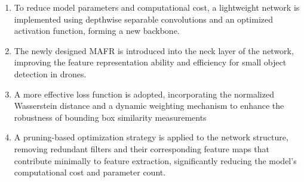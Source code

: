\documentclass{article}
\begin{document}
\begin{enumerate}
  \item To reduce model parameters and computational cost, a lightweight network is implemented using depthwise separable convolutions and an optimized activation function, forming a new backbone.
  \item The newly designed MAFR is introduced into the neck layer of the network, improving the feature representation ability and efficiency for small object detection in drones.
  \item A more effective loss function is adopted, incorporating the normalized Wasserstein distance and a dynamic weighting mechanism to enhance the robustness of bounding box similarity measurements
  \item A pruning-based optimization strategy is applied to the network structure, removing redundant filters and their corresponding feature maps that contribute minimally to feature extraction, significantly reducing the model's computational cost and parameter count.
\end{enumerate}
\end{document}
